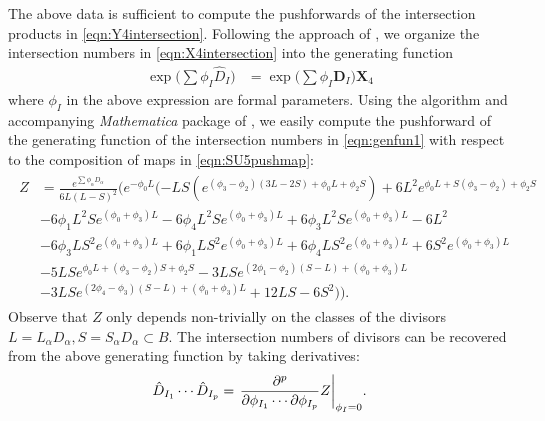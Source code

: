 \documentclass[11pt,oneside,english]{article}
\numberwithin{equation}{section}
\let\originalleft\left
\let\originalright\right
\renewcommand*{\left}{\mathopen{}\mathclose\bgroup\originalleft}
\renewcommand*{\right}{\aftergroup\egroup\originalright}
\theoremstyle{definition}
\begin{document}
The above data is sufficient to compute the pushforwards of the intersection products in \cref{eqn:Y4intersection}. Following the approach of \cite{Jefferson:2022xft}, we organize the intersection numbers in \cref{eqn:X4intersection} into the generating function
	\begin{align}
	\label{eqn:genfun1}
		\exp\bigl({ \sum \phi_I \hat D_I}\bigr) &= \exp\bigl({ \sum \phi_I \boldsymbol{D}_I}\bigr)  \boldsymbol{X}_4 
	\end{align}
where $\phi_I$ in the above expression are formal parameters. Using the algorithm and accompanying \emph{Mathematica} package of \cite{Jefferson:2022xft}, we easily compute the pushforward of the generating function of the intersection numbers in \cref{eqn:genfun1} with respect to the composition of maps in \cref{eqn:SU5pushmap}:
\begin{align}
\begin{split}
\label{eqn:genfun}
Z&=\frac{e^{\sum \phi_\alpha D_\alpha}}{6 L  (L-S)^2}  \biggl(e^{- \phi _0 L}  (-L S (e^{(\phi _3-\phi _2) (3 L-2 S)+\phi _0 L + \phi _2 S})+6 L^2  e^{\phi _0 L +S (\phi _3-\phi _2)+ \phi _2 S}\\
&-6 \phi _1L^2  S  e^{(\phi _0  +\phi _3) L }-6 \phi _4 L^2  S  e^{(\phi _0+ \phi _3)L}+6\phi _3 L^2  S   e^{(\phi _0 + \phi _3)L}-6 L^2\\
&-6\phi _3 L S^2  e^{( \phi _0+ \phi _3)L}+6 \phi _1 L S^2  e^{(\phi _0+ \phi _3)L}+6 \phi _4 L  S^2  e^{( \phi _0+ \phi _3)L}+6 S^2  e^{( \phi _0+ \phi _3)L}\\
&-5 L  S e^{\phi _0 L + (\phi _3-\phi _2)S+ \phi _2S}-3 L  S  e^{(2 \phi _1-\phi _2) (S-L)+( \phi _0+ \phi _3)L}\\
&-3 L  S  e^{(2 \phi _4-\phi _3)  (S-L)+(\phi _0  +\phi _3)L }+12 L  S-6 S^2)\biggr).
\end{split}
\end{align}
Observe that $Z$ only depends non-trivially on the classes of the divisors $L = L_\alpha D_\alpha, S = S_\alpha D_\alpha \subset B$. The intersection numbers of divisors can be recovered from the above generating function by taking derivatives:
	\begin{align}
	\label{eqn:intnum}
		\hat D_{I_1} \cdots \hat D_{I_p} =  \left. \frac{\partial^p}{\partial \phi_{I_1} \cdots \partial \phi_{I_p}} Z\right|_{\phi_I =0}.
	\end{align}
\end{document}

